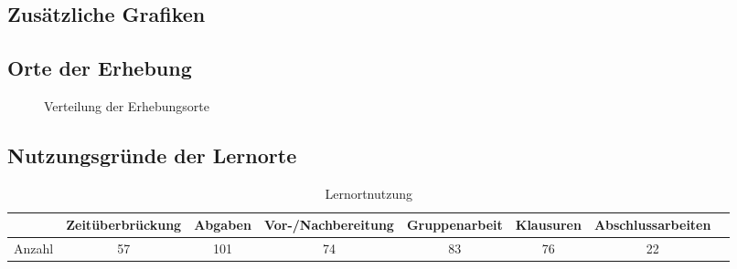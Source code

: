 \documentclass[11pt, a4paper]{article}
\begin{document}
\subsection{Zusätzliche Grafiken}
\vspace{0.22cm}
\subsection*{Orte der Erhebung}
\begin{figure}[h]
	\centering
	
	\caption{Verteilung der Erhebungsorte}
\end{figure}
\subsection*{Nutzungsgründe der Lernorte}
\begin{table}[h]
	\begin{tabular}{c|ccccccc}
		& Zeitüberbrückung & Abgaben & Vor-/Nachbereitung & Gruppenarbeit & Klausuren & Abschlussarbeiten \\ \hline
		Anzahl & 57            & 101             & 74                          & 83                     & 76                 & 22                      
	\end{tabular}
	\caption{Lernortnutzung}
\end{table}
\newpage
\end{document}

